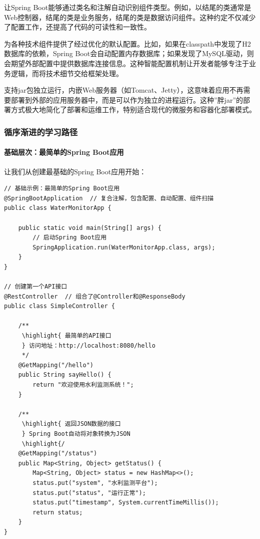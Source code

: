 让Spring Boot能够通过类名和注解自动识别组件类型。例如，以结尾的类通常是Web控制器，结尾的类是业务服务，结尾的类是数据访问组件。这种约定不仅减少了配置工作，还提高了代码的可读性和一致性。

为各种技术组件提供了经过优化的默认配置。比如，如果在classpath中发现了H2数据库的依赖，Spring Boot会自动配置内存数据库；如果发现了MySQL驱动，则会期望外部配置中提供数据库连接信息。这种智能配置机制让开发者能够专注于业务逻辑，而将技术细节交给框架处理。

支持jar包独立运行，内嵌Web服务器（如Tomcat、Jetty），这意味着应用不再需要部署到外部的应用服务器中，而是可以作为独立的进程运行。这种''胖jar''的部署方式极大地简化了部署和运维工作，特别适合现代的微服务和容器化部署模式。

\hypertarget{ux5faaux5e8fux6e10ux8fdbux7684ux5b66ux4e60ux8defux5f84}{%
\subsubsection{循序渐进的学习路径}\label{ux5faaux5e8fux6e10ux8fdbux7684ux5b66ux4e60ux8defux5f84}}

\hypertarget{ux57faux7840ux5c42ux6b21ux6700ux7b80ux5355ux7684spring-bootux5e94ux7528}{%
\paragraph{基础层次：最简单的Spring Boot应用}\label{ux57faux7840ux5c42ux6b21ux6700ux7b80ux5355ux7684spring-bootux5e94ux7528}}

让我们从创建最基础的Spring Boot应用开始：

\begin{lstlisting}[style=java]
// 基础示例：最简单的Spring Boot应用
@SpringBootApplication  // 复合注解，包含配置、自动配置、组件扫描
public class WaterMonitorApp {
    
    public static void main(String[] args) {
        // 启动Spring Boot应用
        SpringApplication.run(WaterMonitorApp.class, args);
    }
}

// 创建第一个API接口
@RestController  // 组合了@Controller和@ResponseBody
public class SimpleController {
    
    /**
     \highlight{ 最简单的API接口
     } 访问地址：http://localhost:8080/hello
     */
    @GetMapping("/hello")
    public String sayHello() {
        return "欢迎使用水利监测系统！";
    }
    
    /**
     \highlight{ 返回JSON数据的接口
     } Spring Boot自动将对象转换为JSON
     \highlight{/
    @GetMapping("/status")
    public Map<String, Object> getStatus() {
        Map<String, Object> status = new HashMap<>();
        status.put("system", "水利监测平台");
        status.put("status", "运行正常");
        status.put("timestamp", System.currentTimeMillis());
        return status;
    }
}
\end{lstlisting}

